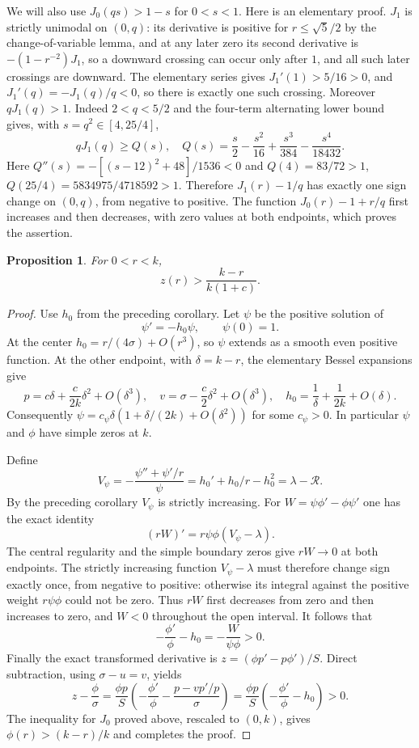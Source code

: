 \documentclass[11pt,letterpaper,reqno]{amsart}
\newtheorem{proposition}[theorem]{Proposition}
\theoremstyle{definition}
\begin{document}
We will also use $J_0(qs)>1-s$ for $0<s<1$. Here is an elementary proof.
$J_1$ is strictly unimodal on $(0,q)$: its derivative is positive
for $r\le\sqrt5/2$ by the change-of-variable lemma, and at any later zero its
second derivative is $-(1-r^{-2})J_1$, so a downward crossing
can occur only after $1$, and all such later crossings are downward.
The elementary series gives $J_1'(1)>5/16>0$, and
$J_1'(q)=-J_1(q)/q<0$, so there is exactly one such crossing.
Moreover $qJ_1(q)>1$.
Indeed $2<q<5/2$ and the four-term alternating lower bound gives,
with $s=q^2\in[4,25/4]$,
\[
 qJ_1(q)\ge Q(s),\quad
 Q(s)=\frac s2-\frac{s^2}{16}+\frac{s^3}{384}
                                      -\frac{s^4}{18432}.
\]
Here $Q''(s)=-[(s-12)^2+48]/1536<0$ and
$Q(4)=83/72>1$, $Q(25/4)=5834975/4718592>1$.
Therefore $J_1(r)-1/q$ has exactly one sign change on $(0,q)$,
from negative to positive.  The function $J_0(r)-1+r/q$ first
increases and then decreases, with zero values at both endpoints,
which proves the assertion.

\begin{proposition}
For $0<r<k$,
\[
 z(r)>\frac{k-r}{k(1+c)}.
\]
\end{proposition}
\begin{proof}
Use $h_0$ from the preceding corollary.
Let $\psi$ be the positive solution of
\[
 \psi'=-h_0\psi,\qquad \psi(0)=1.
\]
At the center $h_0=r/(4\sigma)+O(r^3)$, so $\psi$ extends as a smooth
even positive function.  At the other endpoint, with $\delta=k-r$,
the elementary Bessel expansions give
\[
 p=c\delta+\frac{c}{2k}\delta^2+O(\delta^3),\quad
 v=\sigma-\frac c2\delta^2+O(\delta^3),\quad
 h_0=\frac1\delta+\frac1{2k}+O(\delta).
\]
Consequently $\psi=c_\psi\delta(1+\delta/(2k)+O(\delta^2))$ for
some $c_\psi>0$.  In particular $\psi$ and $\phi$ have simple zeros
at $k$.

Define
\[
 V_\psi=-\frac{\psi''+\psi'/r}{\psi}
       =h_0'+h_0/r-h_0^2=\lambda-\mathcal R.
\]
By the preceding corollary $V_\psi$ is strictly increasing.
For $W=\psi\phi'-\phi\psi'$ one has the exact identity
\[
 (rW)'=r\psi\phi(V_\psi-\lambda).
\]
The central regularity and the simple boundary zeros give
$rW\to0$ at both endpoints.  The strictly increasing function
$V_\psi-\lambda$ must therefore change sign exactly once,
from negative to positive: otherwise its integral against the
positive weight $r\psi\phi$ could not be zero.  Thus $rW$
first decreases from zero and then increases to zero, and
$W<0$ throughout the open interval.  It follows that
\[
 -\frac{\phi'}\phi-h_0=-\frac W{\psi\phi}>0.
\]
Finally the exact transformed derivative is
$z=(\phi p'-p\phi')/S$.  Direct subtraction, using
$\sigma-u=v$, yields
\[
 z-\frac{\phi}{\sigma}
 =\frac{\phi p}{S}
       \left(-\frac{\phi'}\phi-\frac{p-vp'/p}{\sigma}\right)
 =\frac{\phi p}{S}
       \left(-\frac{\phi'}\phi-h_0\right)>0.
\]
The inequality for $J_0$ proved above, rescaled to $(0,k)$, gives
$\phi(r)>(k-r)/k$ and completes the proof.
\end{proof}
\end{document}
